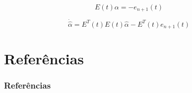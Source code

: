 \documentclass[aspectratio=169]{beamer}
\begin{document}
\begin{frame}

\begin{equation}
E(t)\alpha = -e_{n+1}(t)
\end{equation}

\begin{equation}
\dot{\hat{\alpha}} = E^T(t)E(t)\hat{\alpha} - E^T(t)e_{n+1}(t)  
\end{equation}

\end{frame}



\section{Referências}


\begin{frame}[allowframebreaks]
\frametitle{Referências}
\nocite{narendra1}
\nocite{narendra_main}
\nocite{narendra2012rationale}
\nocite{narendra1997}
\nocite{han1}
\nocite{han2010}
\nocite{han2012}
\nocite{kuipers1}
\nocite{ioannou2}
\nocite{chen}
\nocite{ogata}
\nocite{khalil}
\end{frame}

\end{document}
